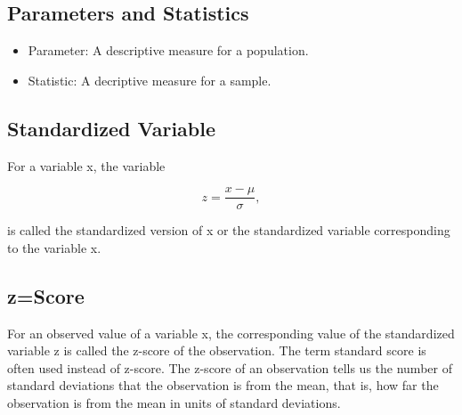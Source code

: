 \documentclass[12pt]{article}
\begin{document}
        \subsection*{Parameters and Statistics}
            \begin{itemize}
                \item Parameter: A descriptive measure for a population.
                \item Statistic: A decriptive measure for a sample.
            \end{itemize}
        \subsection*{Standardized Variable}
            For a variable x, the variable
            \begin{center}
                \[
                    z = \frac{x-\mu}{\sigma},    
                \]
            \end{center}
            is called the standardized version of x or the standardized variable corresponding to
            the variable x.
        \subsection*{z=Score}
            For an observed value of a variable x, the corresponding value of the standardized 
            variable z is called the z-score of the observation. The term standard score is often
            used instead of z-score. The z-score of an observation tells us the number of standard
            deviations that the observation is from the mean, that is, how far the observation is 
            from the mean in units of standard deviations.
\end{document}

